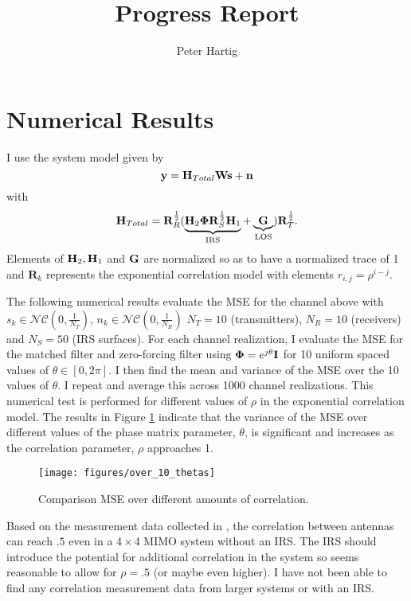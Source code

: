 \documentclass[12pt,a4paper]{report}
\title{Progress Report}
\author{Peter Hartig}
\begin{document}
\maketitle
\tableofcontents

\section{Numerical Results}
I use the system model given by 
\begin{equation}
\mathbf{y} = \mathbf{H}_{Total} \mathbf{W} \mathbf{s}  + \mathbf{n}
\end{equation}
with 
	\begin{equation}
	\mathbf{H}_{Total} = \mathbf{R}_{R}^{\frac{1}{2}}(\underbrace{\mathbf{H}_{2}\boldsymbol{\Phi}\mathbf{R}_{S}^{\frac{1}{2}}\mathbf{H}_{1}}_{\text{IRS}} + \underbrace{\mathbf{G}}_{\text{LOS}})\mathbf{R}_{T}^{\frac{1}{2}}.
	\end{equation}
Elements of $\mathbf{H}_{2},\mathbf{H}_{1}$ and $\mathbf{G}$ are normalized so as to have a normalized trace of 1 and $\mathbf{R}_{k}$ represents the exponential correlation model with elements $r_{i,j}=\rho^{i-j}$.
\par
The following numerical results evaluate the MSE for the channel above with $s_k \in \mathcal{NC}(0,\frac{1}{N_T})$, $n_k \in \mathcal{NC}(0,\frac{1}{N_R})$
$N_T = 10$ (transmitters), $N_R = 10$ (receivers) and $N_S = 50$ (IRS surfaces).
For each channel realization, I evaluate the MSE for the matched filter and zero-forcing filter using $\boldsymbol{\Phi} = e^{j\theta}\mathbf{I}$ for 10 uniform spaced values of $\theta \in [0, 2\pi]$. I then find the mean and variance of the MSE over the 10 values of $\theta$. I repeat and average this across 1000 channel realizations. This numerical test is performed for different values of $\rho$ in the exponential correlation model. The results in Figure \ref{MSE_correlation} indicate that the variance of the MSE over different values of the phase matrix parameter, $\theta$,  is significant and increases as the correlation parameter, $\rho$ approaches 1.
		\begin{figure}[H]
	\texttt{[image: figures/over\_10\_thetas]}
	  \caption{Comparison MSE over different amounts of correlation.}
	  	  \label{MSE_correlation}
	\end{figure}

Based on the measurement data collected in \cite{martin2000multiple}, the correlation between antennas can reach $.5$ even in a $4 \times 4 $ MIMO system without an IRS. 
The IRS should introduce the potential for additional correlation in the system so seems reasonable to allow for $\rho = .5$ (or maybe even higher). I have not been able to find any correlation measurement data from larger systems or with an IRS.
\end{document}

